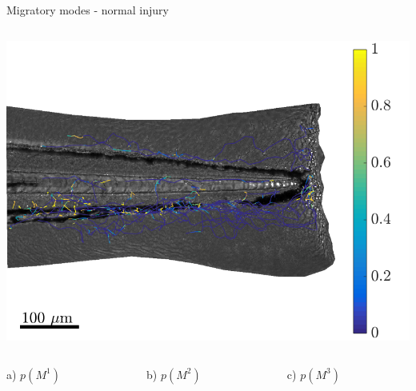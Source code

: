 \documentclass[mathserif,11pt]{beamer}
\begin{document}
\begin{frame}{Migratory modes - normal injury}
\begin{columns}
\begin{column}{0.31\textwidth}
		\vspace{0.2cm}
		\includegraphics[scale=0.18]{Figures/mode3_fish3.png}
	\end{column}
\end{columns}
\begin{columns}
	\centering
	\begin{column}{0.31\textwidth}
		\centering
		\footnotesize{ a) $p(M^1)$}
	\end{column}
	\begin{column}{0.31\textwidth}
		\centering
		\footnotesize{ b)  $p(M^2)$}
	\end{column}
	\begin{column}{0.31\textwidth}
		\centering
		\footnotesize{ c)  $p(M^3)$}
	\end{column}
\end{columns}
\end{frame}
\end{document}
